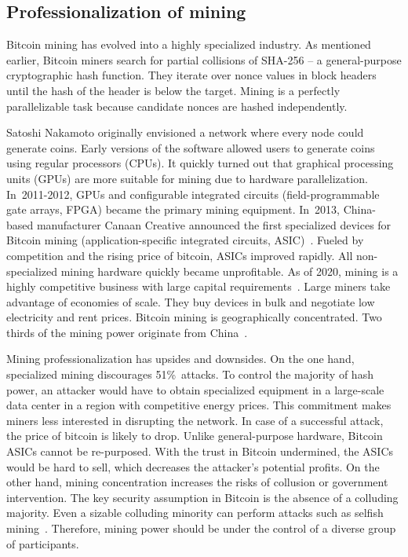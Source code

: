 \subsection{Professionalization of mining}

Bitcoin mining has evolved into a highly specialized industry.
As mentioned earlier, Bitcoin miners search for partial collisions of SHA-256 -- a general-purpose cryptographic hash function.
They iterate over nonce values in block headers until the hash of the header is below the target.
Mining is a perfectly parallelizable task because candidate nonces are hashed independently.

Satoshi Nakamoto originally envisioned a network where every node could generate coins.
Early versions of the software allowed users to generate coins using regular processors (CPUs).
It quickly turned out that graphical processing units (GPUs) are more suitable for mining due to hardware parallelization.
In~2011-2012, GPUs and configurable integrated circuits (field-programmable gate arrays, FPGA) became the primary mining equipment.
In~2013, China-based manufacturer Canaan Creative announced the first specialized devices for Bitcoin mining (application-specific integrated circuits, ASIC)~\cite{Kim2020}.
Fueled by competition and the rising price of bitcoin, ASICs improved rapidly.
All non-specialized mining hardware quickly became unprofitable.
As of 2020, mining is a highly competitive business with large capital requirements~\cite{Kroll2013}.
Large miners take advantage of economies of scale.
They buy devices in bulk and negotiate low electricity and rent prices.
Bitcoin mining is geographically concentrated.
Two thirds of the mining power originate from China~\cite{Rauchs2020}.

Mining professionalization has upsides and downsides.
On the one hand, specialized mining discourages 51\%~attacks.
To control the majority of hash power, an attacker would have to obtain specialized equipment in a large-scale data center in a region with competitive energy prices.
This commitment makes miners less interested in disrupting the network.
In case of a successful attack, the price of bitcoin is likely to drop.
Unlike general-purpose hardware, Bitcoin ASICs cannot be re-purposed.
With the trust in Bitcoin undermined, the ASICs would be hard to sell, which decreases the attacker's potential profits.
On the other hand, mining concentration increases the risks of collusion or government intervention.
The key security assumption in Bitcoin is the absence of a colluding majority.
Even a sizable colluding minority can perform attacks such as selfish mining~\cite{Eyal2018}.
Therefore, mining power should be under the control of a diverse group of participants.


